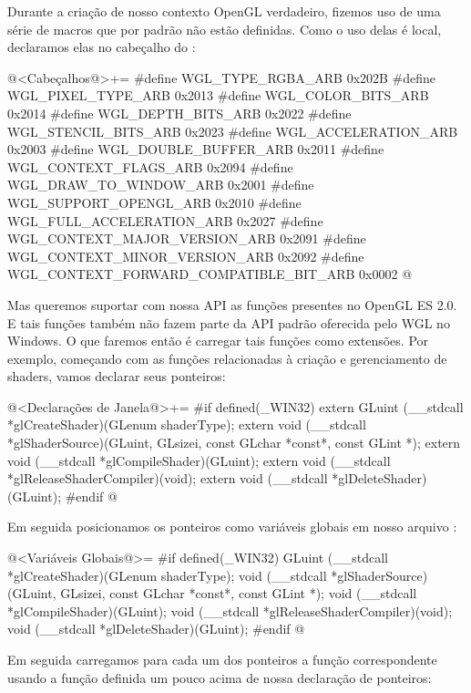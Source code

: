 Durante a criação de nosso contexto OpenGL verdadeiro, fizemos uso de
uma série de macros que por padrão não estão definidas. Como o uso
delas é local, declaramos elas no cabeçalho do :

\iniciocodigo
@<Cabeçalhos@>+=
#define WGL_TYPE_RGBA_ARB                      0x202B
#define WGL_PIXEL_TYPE_ARB                     0x2013
#define WGL_COLOR_BITS_ARB                     0x2014
#define WGL_DEPTH_BITS_ARB                     0x2022
#define WGL_STENCIL_BITS_ARB                   0x2023
#define WGL_ACCELERATION_ARB                   0x2003
#define WGL_DOUBLE_BUFFER_ARB                  0x2011
#define WGL_CONTEXT_FLAGS_ARB                  0x2094
#define WGL_DRAW_TO_WINDOW_ARB                 0x2001
#define WGL_SUPPORT_OPENGL_ARB                 0x2010
#define WGL_FULL_ACCELERATION_ARB              0x2027
#define WGL_CONTEXT_MAJOR_VERSION_ARB          0x2091
#define WGL_CONTEXT_MINOR_VERSION_ARB          0x2092
#define WGL_CONTEXT_FORWARD_COMPATIBLE_BIT_ARB 0x0002
@
\fimcodigo

Mas queremos suportar com nossa API as funções presentes no OpenGL ES
2.0. E tais funções também não fazem parte da API padrão oferecida
pelo WGL no Windows. O que faremos então é carregar tais funções como
extensões. Por exemplo, começando com as funções relacionadas à
criação e gerenciamento de shaders, vamos declarar seus ponteiros:

\iniciocodigo
@<Declarações de Janela@>+=
#if defined(_WIN32)
extern GLuint (__stdcall *glCreateShader)(GLenum shaderType);
extern void (__stdcall *glShaderSource)(GLuint, GLsizei, const GLchar *const*,
                                        const GLint *);
extern void (__stdcall *glCompileShader)(GLuint);
extern void (__stdcall *glReleaseShaderCompiler)(void);
extern void (__stdcall *glDeleteShader)(GLuint);
#endif
@
\fimcodigo

Em seguida posicionamos os ponteiros como variáveis globais em nosso
arquivo :

\iniciocodigo
@<Variáveis Globais@>=
#if defined(_WIN32)
GLuint (__stdcall *glCreateShader)(GLenum shaderType);
void (__stdcall *glShaderSource)(GLuint, GLsizei, const GLchar *const*,
                                 const GLint *);
void (__stdcall *glCompileShader)(GLuint);
void (__stdcall *glReleaseShaderCompiler)(void);
void (__stdcall *glDeleteShader)(GLuint);
#endif
@
\fimcodigo

Em seguida carregamos para cada um dos ponteiros a função
correspondente usando a função definida um pouco acima de nossa
declaração de ponteiros:

